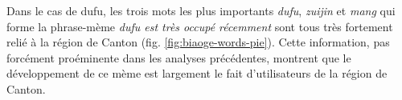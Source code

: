 Dans le cas de dufu, les trois mots les plus importants
\textit{dufu}, \textit{zuijin} et \textit{mang} qui forme la
phrase-m\`eme \textit{dufu est tr\`es occup\'e
r\'ecemment }sont tous tr\`es fortement reli\'e \`a
la r\'egion de Canton (fig. \ref{fig:biaoge-words-pie}). Cette information, pas forc\'ement pro\'eminente
dans les analyses pr\'ec\'edentes, montrent que le d\'eveloppement de
ce m\`eme est largement le fait d{\textquoteright}utilisateurs de la
r\'egion de Canton.